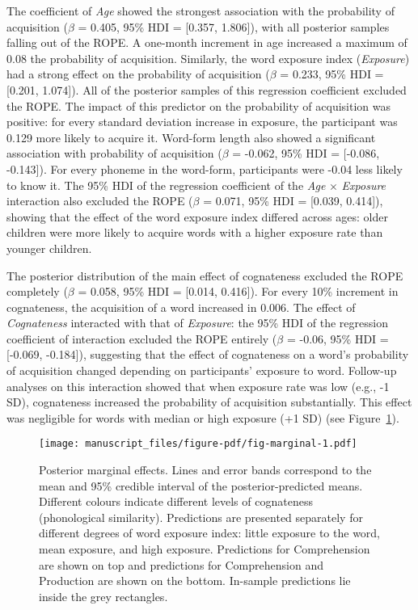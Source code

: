 \documentclass[
]{article}
\begin{document}
The coefficient of \emph{Age} showed the strongest association with the
probability of acquisition (\(\beta\) = 0.405, 95\% HDI = {[}0.357,
1.806{]}), with all posterior samples falling out of the ROPE. A
one-month increment in age increased a maximum of 0.08 the probability
of acquisition. Similarly, the word exposure index (\emph{Exposure}) had
a strong effect on the probability of acquisition (\(\beta\) = 0.233,
95\% HDI = {[}0.201, 1.074{]}). All of the posterior samples of this
regression coefficient excluded the ROPE. The impact of this predictor
on the probability of acquisition was positive: for every standard
deviation increase in exposure, the participant was 0.129 more likely to
acquire it. Word-form length also showed a significant association with
probability of acquisition (\(\beta\) = -0.062, 95\% HDI = {[}-0.086,
-0.143{]}). For every phoneme in the word-form, participants were -0.04
less likely to know it. The 95\% HDI of the regression coefficient of
the \emph{Age} \(\times\) \emph{Exposure} interaction also excluded the
ROPE (\(\beta\) = 0.071, 95\% HDI = {[}0.039, 0.414{]}), showing that
the effect of the word exposure index differed across ages: older
children were more likely to acquire words with a higher exposure rate
than younger children.

The posterior distribution of the main effect of cognateness excluded
the ROPE completely (\(\beta\) = 0.058, 95\% HDI = {[}0.014, 0.416{]}).
For every 10\% increment in cognateness, the acquisition of a word
increased in 0.006. The effect of \emph{Cognateness} interacted with
that of \emph{Exposure}: the 95\% HDI of the regression coefficient of
interaction excluded the ROPE entirely (\(\beta\) = -0.06, 95\% HDI =
{[}-0.069, -0.184{]}), suggesting that the effect of cognateness on a
word's probability of acquisition changed depending on participants'
exposure to word. Follow-up analyses on this interaction showed that
when exposure rate was low (e.g., -1 SD), cognateness increased the
probability of acquisition substantially. This effect was negligible for
words with median or high exposure (+1 SD) (see
Figure~\ref{fig-marginal}).

\begin{figure}

{\centering \texttt{[image: manuscript\_files/figure-pdf/fig-marginal-1.pdf]}

}

\caption{\label{fig-marginal}Posterior marginal effects. Lines and error
bands correspond to the mean and 95\% credible interval of the
posterior-predicted means. Different colours indicate different levels
of cognateness (phonological similarity). Predictions are presented
separately for different degrees of word exposure index: little exposure
to the word, mean exposure, and high exposure. Predictions for
Comprehension are shown on top and predictions for Comprehension and
Production are shown on the bottom. In-sample predictions lie inside the
grey rectangles.}

\end{figure}
\end{document}
